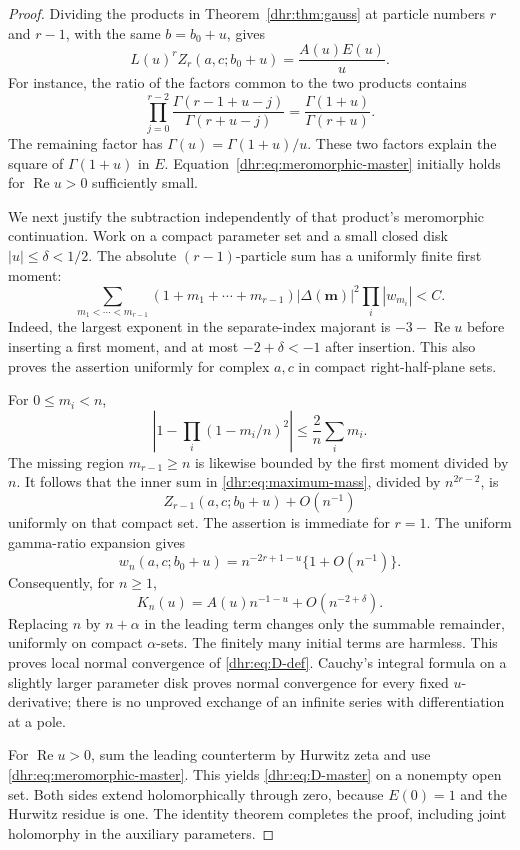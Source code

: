 \documentclass[11pt,letterpaper]{article}
\numberwithin{equation}{section}
\theoremstyle{definition}\newtheorem{definition}[theorem]{Definition}
\theoremstyle{remark}\newtheorem{remark}[theorem]{Remark}
\DeclareMathOperator{\Rea}{Re}
\begin{document}
\begin{proof}
Dividing the products in Theorem~\ref{dhr:thm:gauss} at particle
numbers $r$ and $r-1$, with the same $b=b_0+u$, gives
\begin{equation}\label{dhr:eq:meromorphic-master}
 L(u)^r Z_r(a,c;b_0+u)=\frac{A(u)E(u)}u.
\end{equation}
For instance, the ratio of the factors common to the two products
contains
\[
 \prod_{j=0}^{r-2}
 \frac{\Gamma(r-1+u-j)}{\Gamma(r+u-j)}
 =\frac{\Gamma(1+u)}{\Gamma(r+u)}.
\]
The remaining factor has $\Gamma(u)=\Gamma(1+u)/u$. These two
factors explain the square of $\Gamma(1+u)$ in $E$.
Equation~\eqref{dhr:eq:meromorphic-master} initially holds for
$\Rea u>0$ sufficiently small.

We next justify the subtraction independently of that product's
meromorphic continuation. Work on a compact parameter set and a small
closed disk $|u|\leq\delta<1/2$. The absolute $(r-1)$-particle sum
has a uniformly finite first moment:
\begin{equation}\label{dhr:eq:lower-first-moment}
 \sum_{m_1<\cdots<m_{r-1}}
 (1+m_1+\cdots+m_{r-1})
 |\Delta(\bm m)|^2\prod_i|w_{m_i}|<C.
\end{equation}
Indeed, the largest exponent in the separate-index majorant is
$-3-\Rea u$ before inserting a first moment, and at most
$-2+\delta<-1$ after insertion. This also proves the assertion
uniformly for complex $a,c$ in compact right-half-plane sets.

For $0\leq m_i<n$,
\[
 \left|1-\prod_i(1-m_i/n)^2\right|
 \leq\frac{2}{n}\sum_i m_i.
\]
The missing region $m_{r-1}\geq n$ is likewise bounded by the first
moment divided by $n$. It follows that the inner sum in
\eqref{dhr:eq:maximum-mass}, divided by $n^{2r-2}$, is
\[
 Z_{r-1}(a,c;b_0+u)+O(n^{-1})
\]
uniformly on that compact set. The assertion is immediate for $r=1$.
The uniform gamma-ratio expansion gives
\[
 w_n(a,c;b_0+u)=n^{-2r+1-u}\{1+O(n^{-1})\}.
\]
Consequently, for $n\geq1$,
\begin{equation}\label{dhr:eq:asymptotic-mass}
 K_n(u)=A(u)n^{-1-u}+O(n^{-2+\delta}).
\end{equation}
Replacing $n$ by $n+\alpha$ in the leading term changes only the
summable remainder, uniformly on compact $\alpha$-sets. The finitely
many initial terms are harmless. This proves local normal convergence
of \eqref{dhr:eq:D-def}. Cauchy's integral formula on a slightly
larger parameter disk proves normal convergence for every fixed
$u$-derivative; there is no unproved exchange of an infinite series
with differentiation at a pole.

For $\Rea u>0$, sum the leading counterterm by Hurwitz zeta and use
\eqref{dhr:eq:meromorphic-master}. This yields
\eqref{dhr:eq:D-master} on a nonempty open set. Both sides extend
holomorphically through zero, because $E(0)=1$ and the Hurwitz residue
is one. The identity theorem completes the proof, including joint
holomorphy in the auxiliary parameters.
\end{proof}
\end{document}
